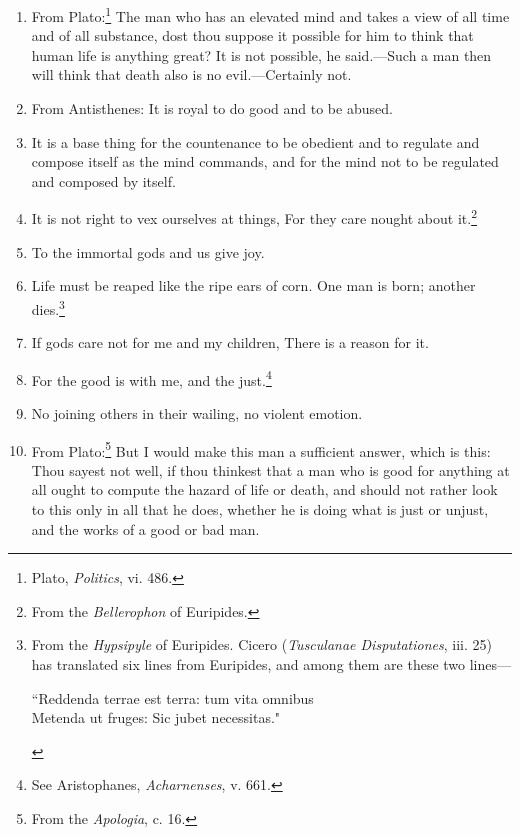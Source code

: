 \begin{enumerate}
\item From Plato:\footnote{Plato, \textit{Politics}, vi. 486.} The man who has an elevated mind and takes a view of all time and of all substance, dost thou suppose it possible for him to think that human life is anything great? It is not possible, he said.—Such a man then will think that death also is no evil.—Certainly not.

\item From Antisthenes: It is royal to do good and to be abused.

\item It is a base thing for the countenance to be obedient and to regulate and compose itself as the mind commands, and for the mind not to be regulated and composed by itself.

\item It is not right to vex ourselves at things, For they care nought about it.\footnote{From the \textit{Bellerophon} of Euripides.}

\item To the immortal gods and us give joy.

\item Life must be reaped like the ripe ears of corn. One man is born; another dies.\footnote{From the \textit{Hypsipyle} of Euripides. Cicero (\textit{Tusculanae Disputationes}, iii. 25) has translated six lines from Euripides, and among them are these two lines—
	\begin{displayquote}
		``Reddenda terrae est terra: tum vita omnibus	\\
		Metenda ut fruges: Sic jubet necessitas."
	\end{displayquote}
}

\item If gods care not for me and my children, There is a reason for it.

\item For the good is with me, and the just.\footnote{See Aristophanes, \textit{Acharnenses}, v. 661.}

\item No joining others in their wailing, no violent emotion.

\item From Plato:\footnote{From the \textit{Apologia}, c. 16.} But I would make this man a sufficient answer, which is this: Thou sayest not well, if thou thinkest that a man who is good for anything at all ought to compute the hazard of life or death, and should not rather look to this only in all that he does, whether he is doing what is just or unjust, and the works of a good or bad man.


\end{enumerate}
